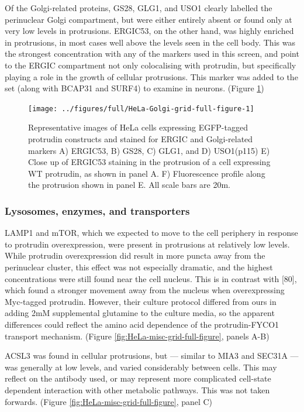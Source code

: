 \documentclass[
  12pt,
  a4paper,
]{book}
\begin{document}
Of the Golgi-related proteins, GS28, GLG1, and USO1 clearly labelled the perinuclear Golgi compartment, but were either entirely absent or found only at very low levels in protrusions. ERGIC53, on the other hand, was highly enriched in protrusions, in most cases well above the levels seen in the cell body. This was the strongest concentration with any of the markers used in this screen, and point to the ERGIC compartment not only colocalising with protrudin, but specifically playing a role in the growth of cellular protrusions. This marker was added to the set (along with BCAP31 and SURF4) to examine in neurons. (Figure \ref{fig:HeLa-Golgi-grid-full-figure})

\begin{figure}
\texttt{[image: ../figures/full/HeLa-Golgi-grid-full-figure-1]} \caption[Protrudin-expressing HeLa cells stained for ERGIC53, GS28, GLG1, and USO1]{Representative images of HeLa cells expressing EGFP-tagged protrudin constructs and stained for ERGIC and Golgi-related markers A) ERGIC53, B) GS28, C) GLG1, and D) USO1(p115)  E) Close up of ERGIC53 staining in the protrusion of a cell expressing WT protrudin, as shown in panel A.  F) Fluorescence profile along the protrusion shown in panel E.  All scale bars are 20\textmu{}m.}\label{fig:HeLa-Golgi-grid-full-figure}
\end{figure}

\hypertarget{lysosomes-enzymes-and-transporters}{%
\subsubsection{Lysosomes, enzymes, and transporters}\label{lysosomes-enzymes-and-transporters}}

LAMP1 and mTOR, which we expected to move to the cell periphery in response to protrudin overexpression, were present in protrusions at relatively low levels. While protrudin overexpression did result in more puncta away from the perinuclear cluster, this effect was not especially dramatic, and the highest concentrations were still found near the cell nucleus. This is in contrast with {[}80{]}, which found a stronger movement away from the nucleus when overexpressing Myc-tagged protrudin. However, their culture protocol differed from ours in adding 2mM supplemental glutamine to the culture media, so the apparent differences could reflect the amino acid dependence of the protrudin-FYCO1 transport mechanism. (Figure \ref{fig:HeLa-misc-grid-full-figure}, panels A-B)

ACSL3 was found in cellular protrusions, but --- similar to MIA3 and SEC31A --- was generally at low levels, and varied considerably between cells. This may reflect on the antibody used, or may represent more complicated cell-state dependent interaction with other metabolic pathways. This was not taken forwards. (Figure \ref{fig:HeLa-misc-grid-full-figure}, panel C)
\end{document}
